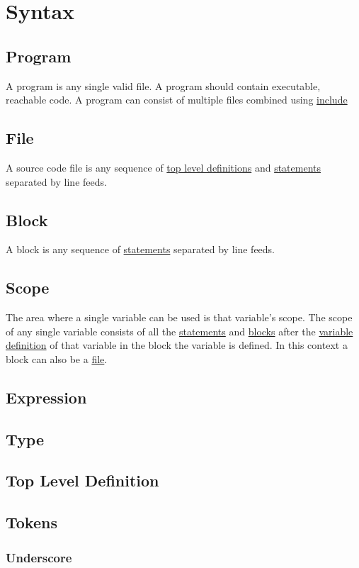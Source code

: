 \section{Syntax}
\label{syntax}

\subsection{Program}
\label{program}
A program is any single valid file.
A program should contain executable, reachable code.
A program can consist of multiple files combined using \hyperref[stat:include]{include}

\subsection{File}
\label{file}
A source code file is any sequence of \hyperref[tld]{top level definitions}
and \hyperref[statement]{statements} separated by line feeds.

\subsection{Block}
\label{block}
A block is any sequence of \hyperref[statement]{statements} separated by line feeds.

\subsection{Scope}
\label{scope}
The area where a single variable can be used is that variable's scope.
The scope of any single variable consists of all the \hyperref[statement]{statements} and \hyperref[block]{blocks}
after the \hyperref[stat:vardes]{variable definition} of that variable in the block the variable is defined.
In this context a block can also be a \hyperref[file]{file}.



\subsection{Expression}
\label{expr}

\subsection{Type}
\label{type}

\subsection{Top Level Definition}
\label{tld}

\subsection{Tokens}
\label{tokens}

\subsubsection{Underscore}
\label{token:_}
